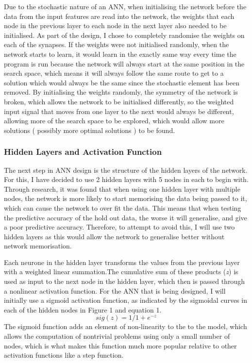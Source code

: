 \documentclass[11pt]{article}
\begin{document}
Due to the stochastic nature of an ANN, when initialising the network before the data from the input features are read into the network, the weights that each node in the previous layer to each node in the next layer also needed to be initialised. As part of the design, I chose to completely randomise the weights on each of the synapses. If the weights were not initialised randomly, when the network starts to learn, it would learn in the exactly same way every time the program is run because the network will always start at the same position in the search space, which means it will always follow the same route to get to a solution which would always be the same since the stochastic element has been removed.  By initialising the weights randomly, the symmetry of the network is broken, which allows the network to be initialised differently, so the weighted input signal that moves from one layer to the next would always be different, allowing more of the search space to be explored, which would allow more solutions ( possibly more optimal solutions ) to be found.
\subsubsection{Hidden Layers and Activation Function }
The next step in ANN design is the structure of the hidden layers of the network.  For this, I have decided to use 2 hidden layers with 5 nodes in each to begin with. Through research, it was found that when using one hidden layer with multiple nodes, the network is more likely to start memorising the data being passed to it, which can cause the network to over fit the data. This means that when testing the predictive accuracy of the hold out data, the worse it will generalise, and give a poor predictive accuracy. Therefore, to attempt to avoid this, I will use two hidden layers as this would allow the network to generalise better without network memorisation. 

Each neurone in the hidden layer transforms the values from the previous layer with a weighted linear summation.The cumulative sum of these products (\textit{z}) is used as input to the next node in the hidden layer, which then is passed through a nonlinear activation function. For the ANN that is being designed, I will initially use a sigmoid activation function, as indicated by the sigmoidal curves in each of the hidden nodes in Figure 1 and equation 1. \begin{equation} sig(z) = 1/1+e^{-z} \end{equation}
The sigmoid function adds an element of non-linearity to the to the model, which allows the computation of nontrivial problems using only a small number of nodes, which is what makes this function much more popular relative to other activation functions like a step function.
\end{document}
